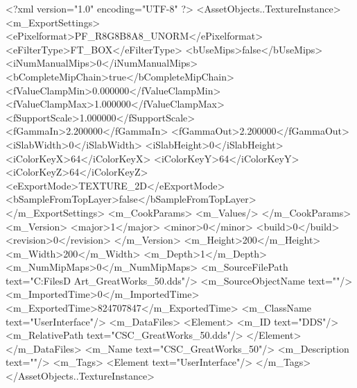<?xml version="1.0" encoding="UTF-8" ?>
<AssetObjects..TextureInstance>
	<m_ExportSettings>
		<ePixelformat>PF_R8G8B8A8_UNORM</ePixelformat>
		<eFilterType>FT_BOX</eFilterType>
		<bUseMips>false</bUseMips>
		<iNumManualMips>0</iNumManualMips>
		<bCompleteMipChain>true</bCompleteMipChain>
		<fValueClampMin>0.000000</fValueClampMin>
		<fValueClampMax>1.000000</fValueClampMax>
		<fSupportScale>1.000000</fSupportScale>
		<fGammaIn>2.200000</fGammaIn>
		<fGammaOut>2.200000</fGammaOut>
		<iSlabWidth>0</iSlabWidth>
		<iSlabHeight>0</iSlabHeight>
		<iColorKeyX>64</iColorKeyX>
		<iColorKeyY>64</iColorKeyY>
		<iColorKeyZ>64</iColorKeyZ>
		<eExportMode>TEXTURE_2D</eExportMode>
		<bSampleFromTopLayer>false</bSampleFromTopLayer>
	</m_ExportSettings>
	<m_CookParams>
		<m_Values/>
	</m_CookParams>
	<m_Version>
		<major>1</major>
		<minor>0</minor>
		<build>0</build>
		<revision>0</revision>
	</m_Version>
	<m_Height>200</m_Height>
	<m_Width>200</m_Width>
	<m_Depth>1</m_Depth>
	<m_NumMipMaps>0</m_NumMipMaps>
	<m_SourceFilePath text="C:\Users\Shadow\Desktop\Working Files\2D Art\GreatWorks\CSC_GreatWorks_50.dds"/>
	<m_SourceObjectName text=""/>
	<m_ImportedTime>0</m_ImportedTime>
	<m_ExportedTime>824707847</m_ExportedTime>
	<m_ClassName text="UserInterface"/>
	<m_DataFiles>
		<Element>
			<m_ID text="DDS"/>
			<m_RelativePath text="CSC_GreatWorks_50.dds"/>
		</Element>
	</m_DataFiles>
	<m_Name text="CSC_GreatWorks_50"/>
	<m_Description text=""/>
	<m_Tags>
		<Element text="UserInterface"/>
	</m_Tags>
</AssetObjects..TextureInstance>

